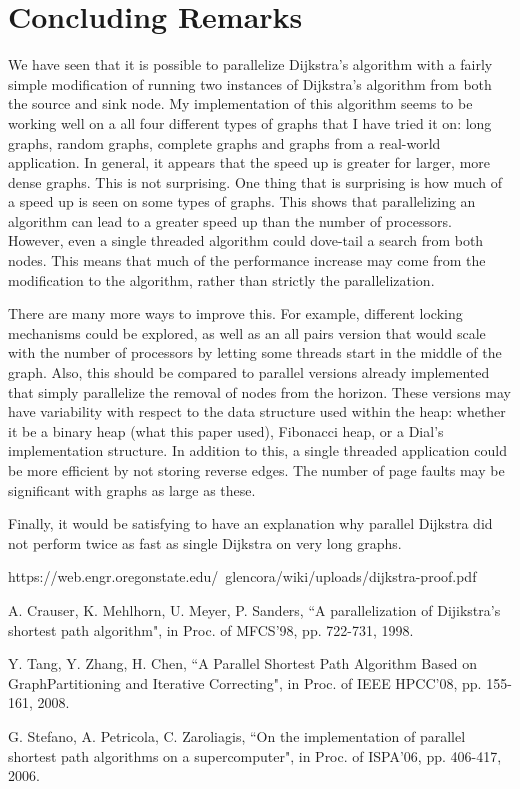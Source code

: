 \documentclass{article}
\begin{document}
\section{Concluding Remarks}

We have seen that it is possible to parallelize Dijkstra's algorithm with a fairly simple modification of running two instances of Dijkstra's algorithm from both the source and sink node.
My implementation of this algorithm seems to be working well on a all four different types of graphs that I have tried it on: long graphs, random graphs, complete graphs and graphs from a real-world application.
In general, it appears that the speed up is greater for larger, more dense graphs.
This is not surprising.
One thing that is surprising is how much of a speed up is seen on some types of graphs.
This shows that parallelizing an algorithm can lead to a greater speed up than the number of processors.
However, even a single threaded algorithm could dove-tail a search from both nodes.
This means that much of the performance increase may come from the modification to the algorithm, rather than strictly the parallelization.

There are many more ways to improve this.
For example, different locking mechanisms could be explored, as well as an all pairs version that would scale with the number of processors by letting some threads start in the middle of the graph.
Also, this should be compared to parallel versions already implemented that simply parallelize the removal of nodes from the horizon.
These versions may have variability with respect to the data structure used within the heap: whether it be a binary heap (what this paper used), Fibonacci heap, or a Dial's implementation structure.
In addition to this, a single threaded application could be more efficient by not storing reverse edges.
The number of page faults may be significant with graphs as large as these.

Finally, it would be satisfying to have an explanation why parallel Dijkstra did not perform twice as fast as single Dijkstra on very long graphs.



\pagebreak


\begin{thebibliography}{9}
https://web.engr.oregonstate.edu/~glencora/wiki/uploads/dijkstra-proof.pdf

A. Crauser, K. Mehlhorn, U. Meyer, P. Sanders, ``A parallelization of Dijikstra’s
shortest path algorithm", in Proc. of MFCS’98, pp. 722-731, 1998.


Y. Tang, Y. Zhang, H. Chen, ``A Parallel Shortest Path Algorithm Based on GraphPartitioning
and Iterative Correcting", in Proc. of IEEE HPCC’08, pp. 155-161,
2008.

G. Stefano, A. Petricola, C. Zaroliagis, ``On the implementation of parallel shortest
path algorithms on a supercomputer", in Proc. of ISPA’06, pp. 406-417, 2006.

\end{thebibliography}
\end{document}
